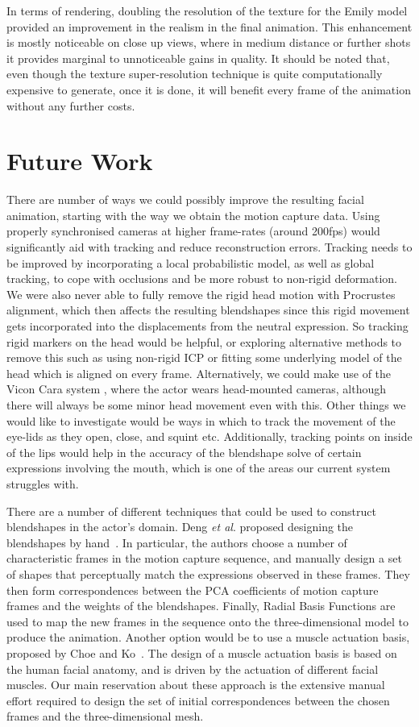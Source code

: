 In terms of rendering, doubling the resolution of the texture for the Emily model provided an improvement in the realism in the final animation.
This enhancement is mostly noticeable on close up views, where in medium distance or further shots it provides marginal to unnoticeable gains in quality.
It should be noted that, even though the texture super-resolution technique is quite computationally expensive to generate, once it is done, it will benefit every frame of the animation without any further costs.


\section{Future Work}

There are number of ways we could possibly improve the resulting facial animation, starting with the way we obtain the motion capture data. Using properly synchronised cameras at higher frame-rates (around 200fps) would significantly aid with tracking and reduce reconstruction errors. Tracking needs to be improved by incorporating a local probabilistic model, as well as global tracking, to cope with occlusions and be more robust to non-rigid deformation. We were also never able to fully remove the rigid head motion with Procrustes alignment, which then affects the resulting blendshapes since this rigid movement gets incorporated into the displacements from the neutral expression. So tracking rigid markers on the head would be helpful, or exploring alternative methods to remove this such as using non-rigid ICP or fitting some underlying model of the head which is aligned on every frame. Alternatively, we could make use of the Vicon Cara system \cite{Cara}, where the actor wears head-mounted cameras, although there will always be some minor head movement even with this. Other things we would like to investigate would be ways in which to track the movement of the eye-lids as they open, close, and squint etc. Additionally, tracking points on inside of the lips would help in the accuracy of the blendshape solve of certain expressions involving the mouth, which is one of the areas our current system struggles with.

There are a number of different techniques that could be used to construct blendshapes in the actor's domain. Deng \textit{et al}. proposed designing the blendshapes by hand~\cite{Deng:2006}. In particular, the authors choose a number of characteristic frames in the motion capture sequence, and manually design a set of shapes that perceptually match the expressions observed in these frames. They then form correspondences between the PCA coefficients of motion capture frames and the weights of the blendshapes. Finally, Radial Basis Functions are used to map the new frames in the sequence onto the three-dimensional model to produce the animation. Another option would be to use a muscle actuation basis, proposed by Choe and Ko~\cite{Choe:2005}. The design of a muscle actuation basis is based on the human facial anatomy, and is driven by the actuation of different facial muscles. Our main reservation about these approach is the extensive manual effort required to design the set of initial correspondences between the chosen frames and the three-dimensional mesh.

